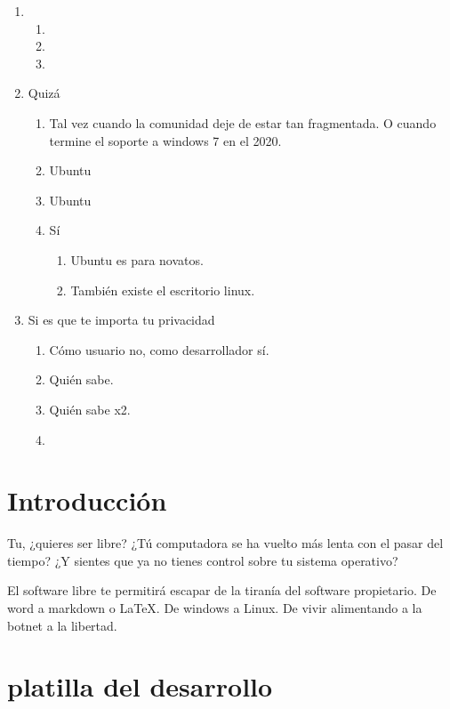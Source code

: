 \documentclass[12pt, twoside]{article}
\begin{document}
\begin{enumerate}
	\item
		\begin{enumerate}
			\item
			\item
			\item
		\end{enumerate}
	\item Quizá
		\begin{enumerate}
			\item Tal vez cuando la comunidad deje de estar tan fragmentada.
				O cuando termine el soporte a windows 7 en el 2020.
			\item Ubuntu
			\item Ubuntu
			\item Sí
				\begin{enumerate}
					\item Ubuntu es para novatos.
					\item También existe el escritorio linux.
				\end{enumerate}
		\end{enumerate}
	\item Si es que te importa tu privacidad
		\begin{enumerate}
			\item Cómo usuario no, como desarrollador sí.
			\item Quién sabe.
			\item Quién sabe x2.
			\item
		\end{enumerate}
\end{enumerate}

\fi
\section{Introducción}%
\label{sec:Introducción}

Tu, ¿quieres ser libre?
¿Tú computadora se ha vuelto más lenta con el pasar del tiempo?
¿Y sientes que ya no tienes control sobre tu sistema operativo?

El software libre te permitirá escapar de la tiranía del software propietario.
De word a markdown o \LaTeX.
De windows a Linux.
De vivir alimentando a la botnet a la libertad.
\section{platilla del desarrollo}%
\end{document}

